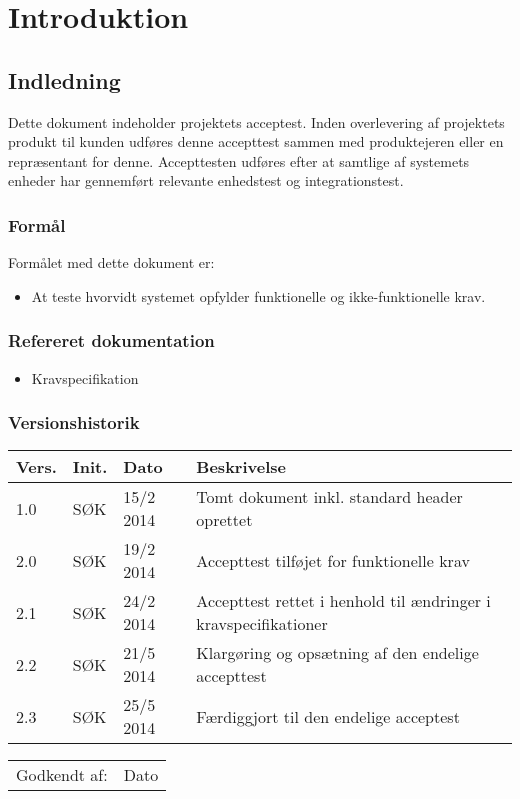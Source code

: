 \chapter{Introduktion}
 \label{chp:introduktion}
\section{Indledning}
Dette dokument indeholder projektets acceptest. Inden overlevering af projektets produkt til kunden udføres denne accepttest sammen med produktejeren eller en repræsentant for denne. Accepttesten udføres efter at samtlige af systemets enheder har gennemført relevante enhedstest og integrationstest. 

\subsection{Formål}
Formålet med dette dokument er:
\begin{itemize}
\item At teste hvorvidt systemet opfylder funktionelle og ikke-funktionelle krav.
\end{itemize}

\subsection{Refereret dokumentation}
\begin{itemize}
\item Kravspecifikation
\end{itemize}

\subsection{Versionshistorik}
\begin{tabular}{p{2cm}p{2cm}p{2cm}p{8cm}}
\textbf{Vers.} & \textbf{Init.} & \textbf{Dato} & \textbf{Beskrivelse} \\
\hline
1.0 & SØK & 15/2 2014 & Tomt dokument inkl. standard header oprettet \\
2.0 & SØK & 19/2 2014 & Accepttest tilføjet for funktionelle krav \\
2.1 & SØK & 24/2 2014 & Accepttest rettet i henhold til ændringer i kravspecifikationer \\
2.2 & SØK & 21/5 2014 & Klargøring og opsætning af den endelige accepttest \\
2.3 & SØK & 25/5 2014 & Færdiggjort til den endelige acceptest \\
\hline

\hline
\end{tabular}

\vspace{\fill}
\begin{tabular}{ p{12cm}  p{3cm} }
\hline
Godkendt af: & Dato
\end{tabular}